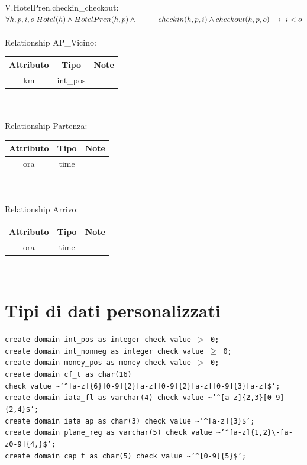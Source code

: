 \documentclass[a4paper,12pt]{report}
\begin{document}
      V.HotelPren.checkin\_checkout: $\forall h, p, i, o \; Hotel(h) \wedge HotelPren(h, p) \wedge \\
      \hspace*{1cm}checkin(h, p, i) \wedge checkout(h, p, o) \;\rightarrow\; i < o $ \\ \\
      Relationship AP\_Vicino: \\
      \begin{tabular}{|c|c|c|}
        \hline Attributo & Tipo & Note \\
        \hline km & int\_pos & \\
        \hline
      \end{tabular} \\ \\
      Relationship Partenza: \\
      \begin{tabular}{|c|c|c|}
        \hline Attributo & Tipo & Note \\
        \hline ora & time & \\
        \hline
      \end{tabular} \\ \\
      Relationship Arrivo: \\
      \begin{tabular}{|c|c|c|}
        \hline Attributo & Tipo & Note \\
        \hline ora & time & \\
        \hline
      \end{tabular} \\

      \section{Tipi di dati personalizzati}
        \texttt{create domain int\_pos as integer check value $>$ 0;} \\
        \texttt{create domain int\_nonneg as integer check value $\geq$ 0;} \\
        \texttt{create domain money\_pos as money check value $>$ 0;} \\
        \texttt{create domain cf\_t as char(16)} \\
        \hspace*{1cm}\texttt{check value \textasciitilde * '\textasciicircum[a-z]\{6\}[0-9]\{2\}[a-z][0-9]\{2\}[a-z][0-9]\{3\}[a-z]\$';} \\
        \texttt{create domain iata\_fl as varchar(4) check value \textasciitilde * '\textasciicircum[a-z]\{2,3\}[0-9]\{2,4\}\$';} \\
        \texttt{create domain iata\_ap as char(3) check value \textasciitilde * '\textasciicircum[a-z]\{3\}\$';} \\
        \texttt{create domain plane\_reg as varchar(5) check value \textasciitilde * '\textasciicircum[a-z]\{1,2\}\textbackslash-[a-z0-9]\{4,\}\$';} \\
        \texttt{create domain cap\_t as char(5) check value \textasciitilde * '\textasciicircum[0-9]\{5\}\$';} \\
\end{document}
